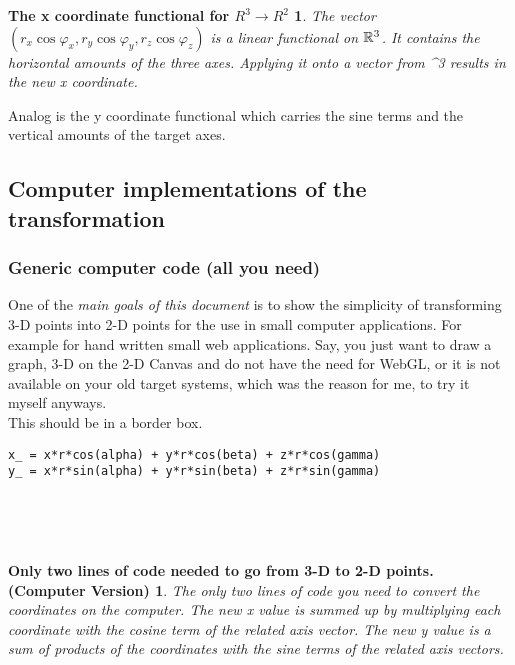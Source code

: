 \documentclass[a4paper]{article}
\begin{document}
\newtheorem{Definition}{The x coordinate functional for $R^{3} \rightarrow R^{2}$}
\begin{Definition}
The vector $(r_x \cos \varphi_x, r_y \cos \varphi_y, r_z \cos \varphi_z)$ is a linear functional on ${\mathbb{R}^{3}}^{\*}$. It contains the horizontal amounts of the three axes. Applying it onto a vector  from ^{3} results in the new x coordinate.
\end{Definition}

Analog is the y coordinate functional which carries the sine terms and the vertical amounts of the target axes.

\subsection{Computer implementations of the transformation}
\subsubsection{Generic computer code (all you need)}

One of the \emph{main goals of this document} is to show the simplicity of transforming 3-D points into 2-D points for the use in small computer applications. For example for hand written small web applications. Say, you just want to draw a graph, 3-D on the 
2-D Canvas and do not have the need for WebGL, or it is not available on your old target systems, which was the reason for me, to try it myself anyways.\\

This should be in a border box.\\

\begin{example}
\begin{lstlisting}
x_ = x*r*cos(alpha) + y*r*cos(beta) + z*r*cos(gamma)
y_ = x*r*sin(alpha) + y*r*sin(beta) + z*r*sin(gamma)
\end{lstlisting}\\

\end{example}\\

\newtheorem{CodeTheorem}{Only two lines of code needed to go from 3-D to 2-D points. (Computer Version)}
\begin{CodeTheorem}
The only two lines of code you need to convert the coordinates on the computer. The new x value
is summed up by multiplying each coordinate with the cosine term of the related axis vector. The new y value
is a sum of products of the coordinates with the sine terms of the related axis vectors.
\end{CodeTheorem}
\end{document}
